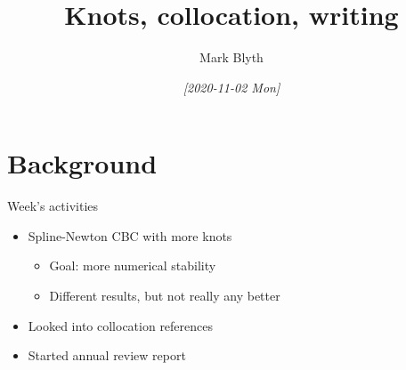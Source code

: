 \documentclass[presentation]{beamer}
\author{Mark Blyth}
\date{\textit{[2020-11-02 Mon]}}
\title{Knots, collocation, writing}
\begin{document}
\maketitle

\section{Background}
\label{sec:org5e54efc}
\begin{frame}[label={sec:orgcce9bfc}]{Week's activities}
\begin{itemize}
\item Spline-Newton CBC with more knots
\begin{itemize}
\item Goal: more numerical stability
\item Different results, but not really any better
\end{itemize}
\end{itemize}
\vfill
\begin{itemize}
\item Looked into collocation references
\end{itemize}
\vfill
\begin{itemize}
\item Started annual review report
\end{itemize}
\end{frame}
\end{document}
